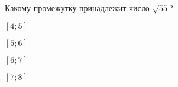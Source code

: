 \begin{ex}
	Какому промежутку принадлежит число $\sqrt{55}$?
	
	\selectanswer
	\begin{enumcols}[columns=4]
		\item $[4;5]$
		\item $[5;6]$
		\item $[6;7]$
		\item $[7;8]$
	\end{enumcols}
\end{ex}